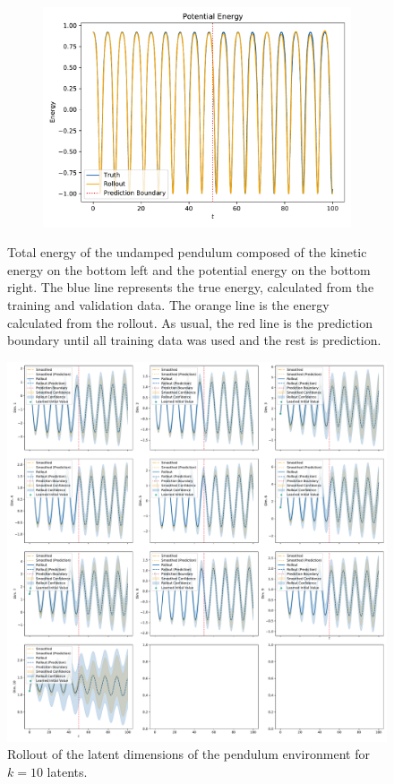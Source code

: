 \begin{figure}
\begin{subfigure}{0.5\linewidth}
				\centering
				\includegraphics[width=\linewidth]{figures/results/pendulum/run-latent-dim-10/energy-R10-N0-potential.pdf}
			\end{subfigure}
			\caption{Total energy of the undamped pendulum composed of the kinetic energy on the bottom left and the potential energy on the bottom right. The blue line represents the true energy, calculated from the training and validation data. The orange line is the energy calculated from the rollout. As usual, the red line is the prediction boundary until all training data was used and the rest is prediction.}
			\label{fig:pendulumEnergyL10}
		\end{figure}

		\begin{figure}
			\centering
			\includegraphics[width=\linewidth]{figures/results/pendulum/run-latent-dim-10/rollout-latents-N0.pdf}
			\caption{Rollout of the latent dimensions of the pendulum environment for \(k = 10 \) latents.}
			\label{fig:pendulumLatentRolloutL10}
		\end{figure}

